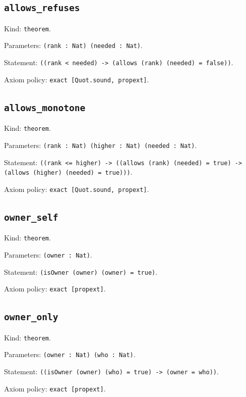 \documentclass[11pt]{article}
\begin{document}
\subsection*{\texttt{allows\_refuses}}
\noindent Kind: \texttt{theorem}.\par
\noindent Parameters: \texttt{(rank : Nat) (needed : Nat)}.\par
\noindent Statement: \texttt{((rank < needed) -> (allows (rank) (needed) = false))}.\par
\noindent Axiom policy: \texttt{exact [Quot.sound, propext]}.\par
\subsection*{\texttt{allows\_monotone}}
\noindent Kind: \texttt{theorem}.\par
\noindent Parameters: \texttt{(rank : Nat) (higher : Nat) (needed : Nat)}.\par
\noindent Statement: \texttt{((rank <= higher) -> ((allows (rank) (needed) = true) -> (allows (higher) (needed) = true)))}.\par
\noindent Axiom policy: \texttt{exact [Quot.sound, propext]}.\par
\subsection*{\texttt{owner\_self}}
\noindent Kind: \texttt{theorem}.\par
\noindent Parameters: \texttt{(owner : Nat)}.\par
\noindent Statement: \texttt{(isOwner (owner) (owner) = true)}.\par
\noindent Axiom policy: \texttt{exact [propext]}.\par
\subsection*{\texttt{owner\_only}}
\noindent Kind: \texttt{theorem}.\par
\noindent Parameters: \texttt{(owner : Nat) (who : Nat)}.\par
\noindent Statement: \texttt{((isOwner (owner) (who) = true) -> (owner = who))}.\par
\noindent Axiom policy: \texttt{exact [propext]}.\par
\end{document}
